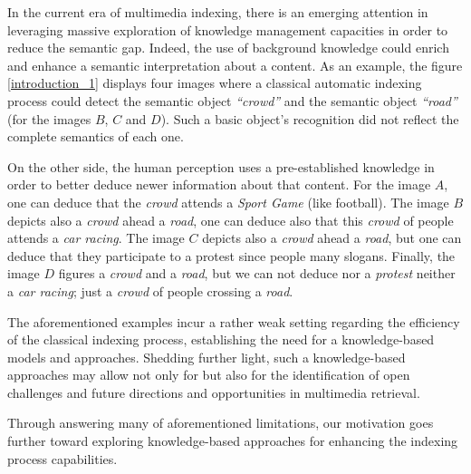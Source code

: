 	In the current era of multimedia indexing, there is an emerging attention in leveraging massive exploration 
	of knowledge management capacities in order to reduce the semantic gap. Indeed, the use of background 
	knowledge could enrich and enhance  a semantic interpretation about a content. 
	As an example, the figure \ref{introduction_1} displays four images where a classical automatic 
	indexing process could detect the semantic object  \textit{``crowd''} and the semantic object
	\emph{``road''} (for the images $B$, $C$ and $D$). Such a basic object's recognition did not reflect
	the complete semantics of each one.
	
	On the other side, the human perception 
	uses a pre-established knowledge in order to better deduce newer information about that content. For the image $A$,
	one can deduce that the \emph{crowd} attends a \emph{Sport Game} (like football). The image $B$ depicts also a 
	\emph{crowd} ahead a \emph{road}, one can deduce also that this \emph{crowd} of people attends a \emph{car racing}. 
	The image $C$ depicts also  a \emph{crowd} ahead a \emph{road}, but one can deduce that  they participate to a protest 
	since people  many slogans.  Finally, the image $D$ figures a \emph{crowd} and a \emph{road}, but we 
	can not deduce  nor a \emph{protest} neither a \emph{car racing}; just a \emph{crowd} of people crossing a \emph{road}.

	The aforementioned examples incur a rather weak setting regarding the efficiency of the classical indexing process, 
	establishing the need for a knowledge-based models and approaches. Shedding further light, 
	such a knowledge-based approaches may allow not only for  but also for 
	the identification of open challenges and future directions and opportunities in multimedia retrieval.

	Through answering many of aforementioned limitations, our motivation goes further toward exploring 
	knowledge-based approaches for enhancing the indexing process capabilities.

